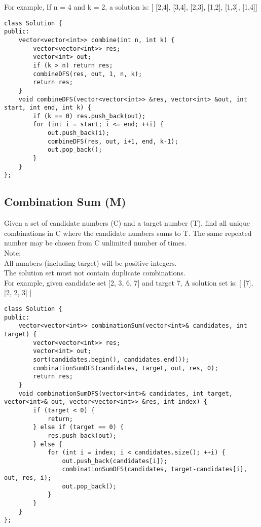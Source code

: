 For example, If n = 4 and k = 2, a solution is: [ [2,4], [3,4], [2,3], [1,2], [1,3], [1,4]]\\

\begin{lstlisting}
class Solution {
public:
    vector<vector<int>> combine(int n, int k) {
        vector<vector<int>> res;
        vector<int> out;
        if (k > n) return res;
        combineDFS(res, out, 1, n, k);
        return res;
    }
    void combineDFS(vector<vector<int>> &res, vector<int> &out, int start, int end, int k) {
        if (k == 0) res.push_back(out);
        for (int i = start; i <= end; ++i) {
            out.push_back(i);
            combineDFS(res, out, i+1, end, k-1);
            out.pop_back();
        }
    }
};
\end{lstlisting}


\subsection{Combination Sum (M)}
Given a set of candidate numbers (C) and a target number (T), find all unique combinations in C where the candidate numbers sums to T. The same repeated number may be chosen from C unlimited number of times.\\

Note:\\
    All numbers (including target) will be positive integers.\\
    The solution set must not contain duplicate combinations.\\

For example, given candidate set [2, 3, 6, 7] and target 7, A solution set is: [ [7], [2, 2, 3] ]\\

\begin{lstlisting}
class Solution {
public:
    vector<vector<int>> combinationSum(vector<int>& candidates, int target) {
        vector<vector<int>> res;
        vector<int> out;
        sort(candidates.begin(), candidates.end());
        combinationSumDFS(candidates, target, out, res, 0);
        return res;
    }
    void combinationSumDFS(vector<int>& candidates, int target, vector<int>& out, vector<vector<int>> &res, int index) {
        if (target < 0) {
            return;
        } else if (target == 0) {
            res.push_back(out);
        } else {
            for (int i = index; i < candidates.size(); ++i) {
                out.push_back(candidates[i]);
                combinationSumDFS(candidates, target-candidates[i], out, res, i);
                out.pop_back();
            }
        }
    }
};
\end{lstlisting}


